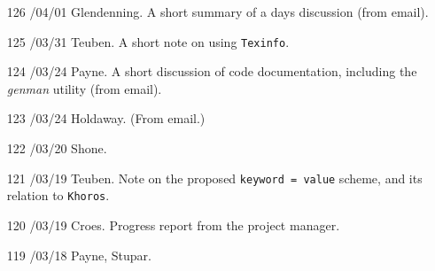 \begin{enumerate}
\item[126]
/04/01 Glendenning.
\linebreak  A short summary of a days discussion (from email).

\item[125]
/03/31 Teuben.
\linebreak  A short note on using \texttt{Texinfo}.

\item[124]
/03/24 Payne.
\linebreak  A short discussion of code documentation, including the \textit{genman}
   utility (from email).

\item[123]
/03/24 Holdaway.
\linebreak  (From email.)

\item[122]
/03/20 Shone.

\item[121]
/03/19 Teuben.
\linebreak  Note on the proposed \texttt{keyword = value} scheme, and its relation
   to \texttt{Khoros}.

\item[120]
/03/19 Croes.
\linebreak  Progress report from the project manager.

\item[119]
/03/18 Payne, Stupar.


\end{enumerate}
